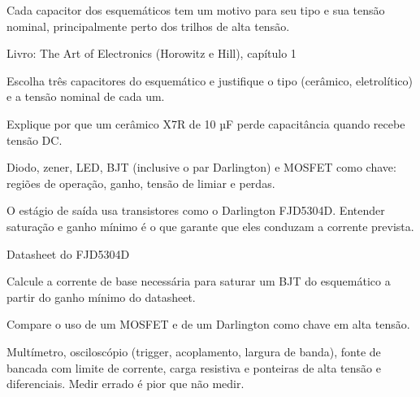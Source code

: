 \begin{noproduto}
Cada capacitor dos esquemáticos tem um motivo para seu tipo e sua tensão nominal, principalmente perto dos trilhos de alta tensão.
\end{noproduto}

\begin{paraestudar}
  \item {}
  \item Livro: The Art of Electronics (Horowitz e Hill), capítulo 1
\end{paraestudar}

\begin{pratique}
  \item Escolha três capacitores do esquemático e justifique o tipo (cerâmico, eletrolítico) e a tensão nominal de cada um.
  \item Explique por que um cerâmico X7R de 10 µF perde capacitância quando recebe tensão DC.
\end{pratique}

Diodo, zener, LED, BJT (inclusive o par Darlington) e MOSFET como chave: regiões de operação, ganho, tensão de limiar e perdas.

\begin{noproduto}
O estágio de saída usa transistores como o Darlington FJD5304D. Entender saturação e ganho mínimo é o que garante que eles conduzam a corrente prevista.
\end{noproduto}

\begin{paraestudar}
  \item {}
  \item {}
  \item Datasheet do FJD5304D
\end{paraestudar}

\begin{pratique}
  \item Calcule a corrente de base necessária para saturar um BJT do esquemático a partir do ganho mínimo do datasheet.
  \item Compare o uso de um MOSFET e de um Darlington como chave em alta tensão.
\end{pratique}

Multímetro, osciloscópio (trigger, acoplamento, largura de banda), fonte de bancada com limite de corrente, carga resistiva e ponteiras de alta tensão e diferenciais. Medir errado é pior que não medir.

